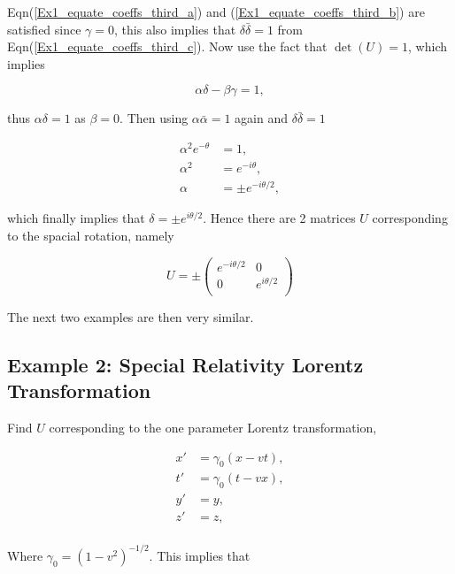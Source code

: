 \noindent Eqn(\ref{Ex1_equate_coeffs_third_a}) and (\ref{Ex1_equate_coeffs_third_b}) are satisfied since $\gamma = 0$, this also implies that $\delta \bar{\delta} = 1$ from Eqn(\ref{Ex1_equate_coeffs_third_c}). Now use the fact that $\det{(U)} = 1$, which implies

\begin{equation*}
\alpha \delta - \beta \gamma = 1,
\end{equation*}

\noindent thus $\alpha \delta = 1$ as $\beta = 0$. Then using $\alpha \bar{\alpha} = 1$ again and $\delta \bar{\delta} = 1$

\begin{align*}
\alpha^2 e^{-\theta} & = 1, \\
\alpha^2 & = e^{-i\theta}, \\
\alpha & = \pm e^{{-i\theta}/2}, 
\end{align*}

\noindent which finally implies that $\delta = \pm e^{i\theta/2}$. Hence there are 2 matrices $U$ corresponding to the spacial rotation, namely

\begin{equation*}
U = \pm
\left(
\begin{array}{cc}
e^{-i\theta/2} & 0            \\
0              & e^{i\theta/2} \\
\end{array}
\right)
\end{equation*}

\noindent The next two examples are then very similar.

\subsection{Example 2: Special Relativity Lorentz Transformation}\label{Special_Linear_Matrices_Example_2}

\noindent Find $U$ corresponding to the one parameter Lorentz transformation,

\begin{align*} 
x' & = \gamma_0 (x-vt), \\
t' & = \gamma_0 (t-vx), \\
y' & = y, \\
z' & = z, \\
\end{align*} 

\noindent Where $\gamma_0 = (1-v^2)^{-1/2}$.  This implies that

